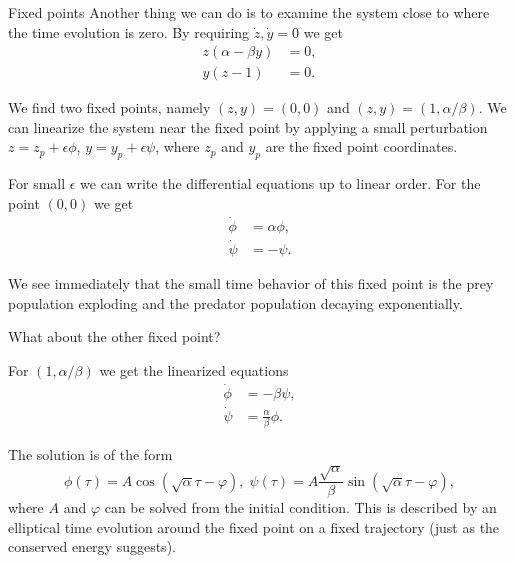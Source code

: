 \begin{frame}{Fixed points}
	Another thing we can do is to examine the system close to where the time evolution is zero. By requiring $ \dot{z}, \dot{y} = 0 $ we get
	\[  
	\begin{split}
		z(\alpha-\beta y) &= 0, \\
		y(z - 1) &= 0. 
	\end{split}
	\]
	
	\pause
	We find two fixed points, namely $ (z,y) = (0,0) $ and $ (z,y) = (1,\alpha/\beta) $. We can linearize the system near the fixed point by applying a small perturbation $ z = z_{p} + \epsilon \phi $, $ y = y_{p} + \epsilon \psi $, where $ z_{p} $ and $ y_{p} $ are the fixed point coordinates. 
	
	\pause
	For small $ \epsilon $ we can write the differential equations up to linear order. For the point $ (0,0) $ we get 
	\[  
	\begin{split}
		\dot{\phi} &= \alpha \phi, \\ 
		\dot{\psi} &= -\psi.
	\end{split}
	\]
	
	\pause
	We see immediately that the small time behavior of this fixed point is the prey population exploding and the predator population decaying exponentially. 
\end{frame}

\begin{frame}
	What about the other fixed point? 
	
	\pause
	For $ (1,\alpha/\beta) $ we get the linearized equations
	\[  
	\begin{split}
		\dot{\phi} &= -\beta \psi, \\ 
		\dot{\psi} &= \frac{\alpha}{\beta} \phi.
	\end{split}
	\]
	
	\pause
	The solution is of the form 
	\[  
	\phi(\tau) = A \cos(\sqrt{\alpha} \tau - \varphi), \; \psi(\tau) = A \frac{ \sqrt{\alpha}}{\beta} \sin(\sqrt{\alpha} \tau - \varphi), 
	\]
	where $ A $ and $ \varphi $ can be solved from the initial condition. This is described by an elliptical time evolution around the fixed point on a fixed trajectory (just as the conserved energy suggests). 
\end{frame}

